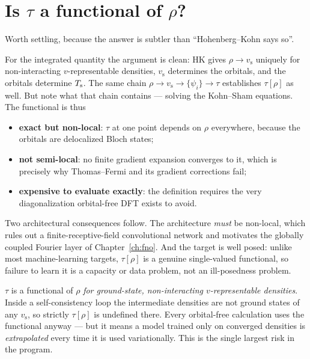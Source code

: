 \section{Is \texorpdfstring{$\tau$}{tau} a functional of \texorpdfstring{$\rho$}{rho}?}

Worth settling, because the answer is subtler than ``Hohenberg--Kohn says so''.

For the integrated quantity the argument is clean: HK gives $\rho\to
v_{\mathrm{s}}$ uniquely for non-interacting $v$-representable densities,
$v_{\mathrm{s}}$ determines the orbitals, and the orbitals determine $T_{\mathrm{s}}$. The
same chain $\rho\to v_{\mathrm{s}}\to\{\psi_i\}\to\tau$ establishes
$\tau[\rho]$ as well. But note what that chain contains --- solving the
Kohn--Sham equations. The functional is thus

\begin{itemize}
  \item \textbf{exact but non-local}: $\tau$ at one point depends on $\rho$
    everywhere, because the orbitals are delocalized Bloch states;
  \item \textbf{not semi-local}: no finite gradient expansion converges to it,
    which is precisely why Thomas--Fermi and its gradient corrections fail;
  \item \textbf{expensive to evaluate exactly}: the definition requires the very
    diagonalization orbital-free DFT exists to avoid.
\end{itemize}

Two architectural consequences follow. The architecture \emph{must} be
non-local, which rules out a finite-receptive-field convolutional network and
motivates the globally coupled Fourier layer of Chapter~\ref{ch:fno}. And the
target is well posed: unlike most machine-learning targets, $\tau[\rho]$ is a
genuine single-valued functional, so failure to learn it is a capacity or data
problem, not an ill-posedness problem.

\begin{pwarn}
$\tau$ is a functional of $\rho$ \emph{for ground-state, non-interacting
$v$-representable densities}. Inside a self-consistency loop the intermediate
densities are not ground states of any $v_{\mathrm{s}}$, so strictly
$\tau[\rho]$ is undefined there. Every orbital-free calculation uses the
functional anyway --- but it means a model trained only on converged densities
is \emph{extrapolated} every time it is used variationally. This is the single
largest risk in the program.
\end{pwarn}

